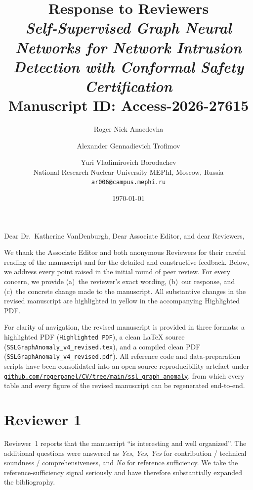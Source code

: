 \documentclass[11pt,a4paper]{article}
\title{\vspace{-1.5cm}
       \textbf{Response to Reviewers} \\[4pt]
       {\large \emph{Self-Supervised Graph Neural Networks for Network
       Intrusion Detection with Conformal Safety Certification}}\\
       {\normalsize Manuscript ID: Access-2026-27615}}
\author{Roger Nick Anaedevha \and Alexander Gennadievich Trofimov \and
        Yuri Vladimirovich Borodachev\\
        National Research Nuclear University MEPhI, Moscow, Russia\\
        \small \texttt{ar006@campus.mephi.ru}}
\date{\today}
\begin{document}
\maketitle
\thispagestyle{fancy}

\noindent Dear Dr.\ Katherine VanDenburgh, Dear Associate Editor, and dear
Reviewers,

\smallskip
We thank the Associate Editor and both anonymous Reviewers for their careful
reading of the manuscript and for the detailed and constructive feedback.
Below, we address every point raised in the initial round of peer review.
For every concern, we provide (a)~the reviewer's exact wording, (b)~our
response, and (c)~the concrete change made to the manuscript.  All
substantive changes in the revised manuscript are highlighted in yellow
in the accompanying Highlighted PDF.

\smallskip
For clarity of navigation, the revised manuscript is provided in three
formats: a highlighted PDF (\texttt{Highlighted PDF}), a clean LaTeX
source (\texttt{SSLGraphAnomaly\_v4\_revised.tex}), and a compiled clean
PDF (\texttt{SSLGraphAnomaly\_v4\_revised.pdf}). All reference code and
data-preparation scripts have been consolidated into an open-source
reproducibility artefact under
\href{https://github.com/rogerpanel/CV/tree/main/ssl_graph_anomaly}%
{\texttt{github.com/rogerpanel/CV/tree/main/ssl\_graph\_anomaly}}, from
which every table and every figure of the revised manuscript can be
regenerated end-to-end.

\section*{Reviewer 1}

Reviewer~1 reports that the manuscript ``is interesting and well
organized''.  The additional questions were answered as \emph{Yes},
\emph{Yes}, \emph{Yes} for contribution / technical soundness /
comprehensiveness, and \emph{No} for reference sufficiency.  We take the
reference-sufficiency signal seriously and have therefore substantially
expanded the bibliography.
\end{document}
